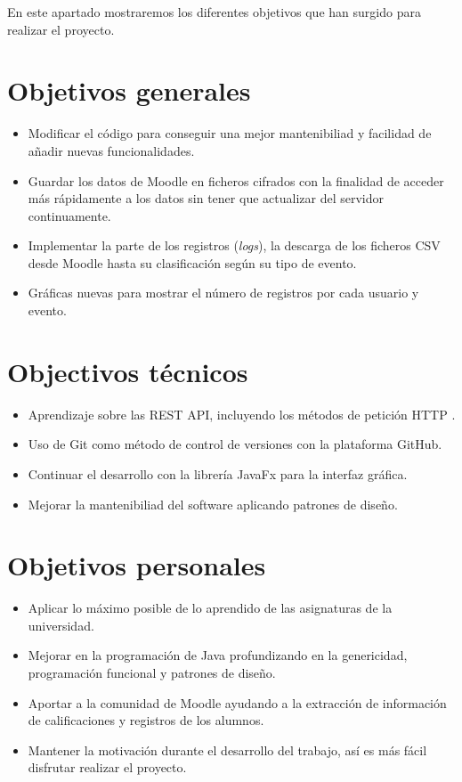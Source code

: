
En este apartado mostraremos los diferentes objetivos que han surgido para realizar el proyecto.

\section{Objetivos generales}

\begin{itemize}
	\item Modificar el código para conseguir una mejor mantenibiliad y facilidad de añadir nuevas funcionalidades. 
	\item Guardar los datos de Moodle en ficheros cifrados con la finalidad de acceder más rápidamente a los datos sin tener que actualizar del servidor continuamente.
	\item Implementar la parte de los registros (\textit{logs}), la descarga de los ficheros CSV desde Moodle hasta su clasificación según su tipo de evento.
	\item Gráficas nuevas para mostrar el número de registros por cada usuario y evento.
\end{itemize}

\section{Objectivos técnicos}
\begin{itemize}
	\item Aprendizaje sobre las REST API, incluyendo los métodos de petición HTTP \cite{noauthor_http_nodate}.
	\item Uso de Git como método de control de versiones con la plataforma GitHub.
	\item Continuar el desarrollo con la librería JavaFx para la interfaz gráfica.
	\item Mejorar la mantenibiliad del software aplicando patrones de diseño.
\end{itemize}

\section{Objetivos personales}
\begin{itemize}
	\item Aplicar lo máximo posible de lo aprendido de las asignaturas de la universidad.
	\item Mejorar en la programación de Java profundizando en la genericidad, programación funcional y patrones de diseño.
	\item Aportar a la comunidad de Moodle ayudando a la extracción de información de calificaciones y registros de los alumnos.
	\item Mantener la motivación durante el desarrollo del trabajo, así es más fácil disfrutar realizar el proyecto.
\end{itemize}
